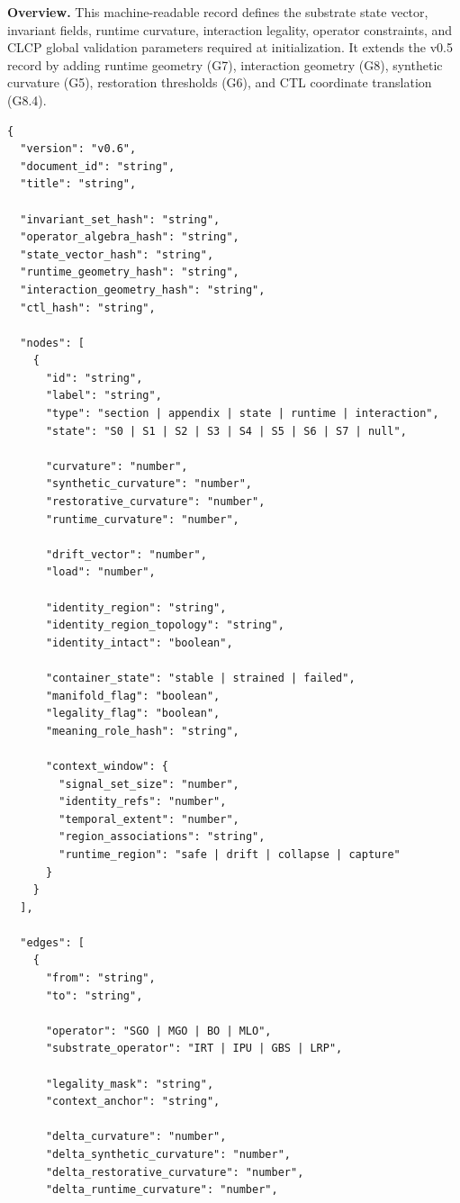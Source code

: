 \bigskip

\noindent\textbf{Overview.}
This machine-readable record defines the substrate state vector, invariant fields,
runtime curvature, interaction legality, operator constraints, and CLCP global
validation parameters required at initialization. It extends the v0.5 record by
adding runtime geometry (G7), interaction geometry (G8), synthetic curvature (G5),
restoration thresholds (G6), and CTL coordinate translation (G8.4).

\begin{mdframed}[linewidth=0.4pt, roundcorner=3pt]
\footnotesize
\begin{verbatim}
{
  "version": "v0.6",
  "document_id": "string",
  "title": "string",

  "invariant_set_hash": "string",
  "operator_algebra_hash": "string",
  "state_vector_hash": "string",
  "runtime_geometry_hash": "string",
  "interaction_geometry_hash": "string",
  "ctl_hash": "string",

  "nodes": [
    {
      "id": "string",
      "label": "string",
      "type": "section | appendix | state | runtime | interaction",
      "state": "S0 | S1 | S2 | S3 | S4 | S5 | S6 | S7 | null",

      "curvature": "number",
      "synthetic_curvature": "number",
      "restorative_curvature": "number",
      "runtime_curvature": "number",

      "drift_vector": "number",
      "load": "number",

      "identity_region": "string",
      "identity_region_topology": "string",
      "identity_intact": "boolean",

      "container_state": "stable | strained | failed",
      "manifold_flag": "boolean",
      "legality_flag": "boolean",
      "meaning_role_hash": "string",

      "context_window": {
        "signal_set_size": "number",
        "identity_refs": "number",
        "temporal_extent": "number",
        "region_associations": "string",
        "runtime_region": "safe | drift | collapse | capture"
      }
    }
  ],

  "edges": [
    {
      "from": "string",
      "to": "string",

      "operator": "SGO | MGO | BO | MLO",
      "substrate_operator": "IRT | IPU | GBS | LRP",

      "legality_mask": "string",
      "context_anchor": "string",

      "delta_curvature": "number",
      "delta_synthetic_curvature": "number",
      "delta_restorative_curvature": "number",
      "delta_runtime_curvature": "number",


\end{verbatim}
\end{mdframed}
